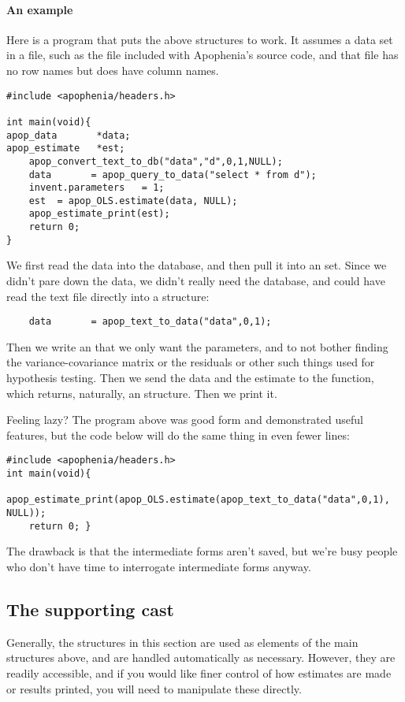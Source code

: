 \paragraph{An example}
Here is a program that puts the above structures to work.  It assumes a
data set in a file, such as the  file included with
Apophenia's source code, and that file has no row names but does have
column names.
\begin{lstlisting}
#include <apophenia/headers.h>

int main(void){
apop_data       *data;
apop_estimate   *est;
    apop_convert_text_to_db("data","d",0,1,NULL);
    data       = apop_query_to_data("select * from d");
    invent.parameters   = 1;
    est  = apop_OLS.estimate(data, NULL);
    apop_estimate_print(est);
    return 0;
}
\end{lstlisting}

We first read the data into the database, and then pull it into an  set. Since we didn't pare down the data, we didn't really
need the database, and could have read the text file directly into a
 structure:
\begin{lstlisting}
    data       = apop_text_to_data("data",0,1);
\end{lstlisting}
Then we write an  that we only want the
parameters, and to not bother finding the variance-covariance matrix or
the residuals or other such things used for hypothesis testing. Then we
send the data and the estimate to the 
function, which returns, naturally, an 
structure. Then we print it.

Feeling lazy? The program above was good form and demonstrated useful
features, but the code below will do the same thing in even fewer lines:

\label{oneliner}
\begin{lstlisting}
#include <apophenia/headers.h>
int main(void){
    apop_estimate_print(apop_OLS.estimate(apop_text_to_data("data",0,1), NULL));
    return 0; }
\end{lstlisting}

The drawback is that the intermediate forms aren't saved, but we're busy
people who don't have time to interrogate intermediate forms anyway.

\subsection{\treesymbol{} The supporting cast}
Generally, the structures in this section are used as elements of the main
structures above, and are handled automatically as necessary. However,
they are readily accessible, and if you would like finer control of how
estimates are made or results printed, you will need to manipulate these
directly.

